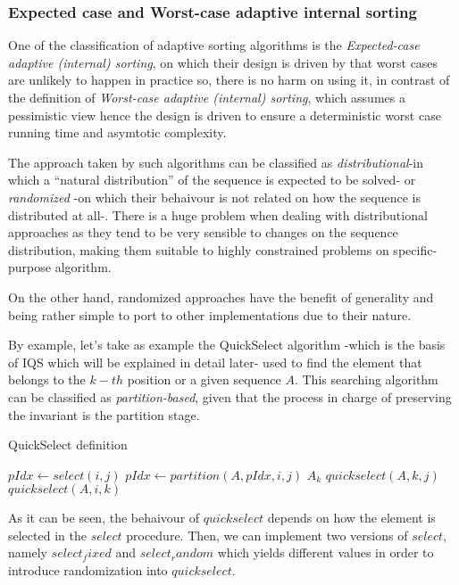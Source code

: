 \subsubsection{Expected case and Worst-case adaptive internal sorting}
One of the classification of adaptive sorting algorithms is the \textit{Expected-case adaptive (internal) sorting}, on which their design is driven by that worst cases are unlikely to happen in practice so, there is no harm on using it, in contrast of the definition of \textit{Worst-case adaptive (internal) sorting}, which assumes a pessimistic view hence the design is driven to ensure a deterministic worst case running time and asymtotic complexity.

The approach taken by such algorithms can be classified as \textit{distributional}-in which a ``natural distribution'' of the sequence is expected to be solved- or \textit{randomized} -on which their behaivour is not related on how the sequence is distributed at all-. There is a huge problem when dealing with distributional approaches as they tend to be very sensible to changes on the sequence distribution, making them suitable to highly constrained problems on specific-purpose algorithm.

On the other hand, randomized approaches have the benefit of generality and being rather simple to port to other implementations due to their nature.

By example, let's take as example the QuickSelect algorithm -which is the basis of IQS which will be explained in detail later- used to find the element that belongs to the $k-th$ position or a given sequence $A$. This searching algorithm can be classified as \textit{partition-based}, given that the process in charge of preserving the invariant is the partition stage.


\begin{algorithm}
  \caption{QuickSelect definition}\label{ALG:QuickSelect}
  \begin{algorithmic}[1]
    \State $pIdx \gets select(i,j)$
    \State $pIdx \gets partition(A,pIdx,i,j)$
     \Return $A_k$
    \EndIf
     \Return $quickselect(A, k, j)$
    \EndIf
     \Return $quickselect(A, i, k)$
    \EndIf
    \EndProcedure
  \end{algorithmic}
\end{algorithm}

As it can be seen, the behaivour of $quickselect$ depends on how the element is selected in the $select$ procedure. Then, we can implement two versions of $select$, namely $select_fixed$ and $select_random$ which yields different values in order to introduce randomization into $quickselect$.

